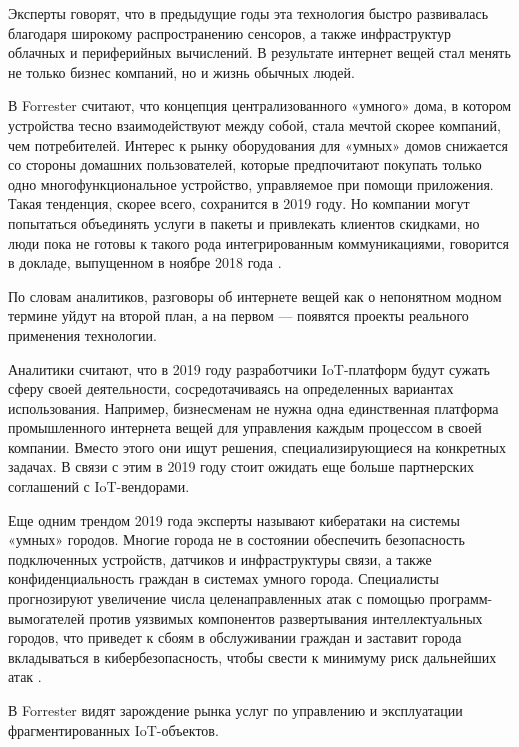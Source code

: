 Эксперты говорят, что в предыдущие годы эта технология быстро развивалась благодаря широкому распространению сенсоров, а также инфраструктур облачных и периферийных вычислений. В результате интернет вещей стал менять не только бизнес компаний, но и жизнь обычных людей.

В Forrester считают, что концепция централизованного «умного» дома, в котором устройства тесно взаимодействуют между собой, стала мечтой скорее компаний, чем потребителей. Интерес к рынку оборудования для «умных» домов снижается со стороны домашних пользователей, которые предпочитают покупать только одно многофункциональное устройство, управляемое при помощи приложения. Такая тенденция, скорее всего, сохранится в 2019 году. Но компании могут попытаться объединять услуги в пакеты и привлекать клиентов скидками, но люди пока не готовы к такого рода интегрированным коммуникациями, говорится в докладе, выпущенном в ноябре 2018 года \cite{iot_data_2019}.

По словам аналитиков, разговоры об интернете вещей как о непонятном модном термине уйдут на второй план, а на первом — появятся проекты реального применения технологии.

Аналитики считают, что в 2019 году разработчики IoT-платформ будут сужать сферу своей деятельности, сосредотачиваясь на определенных вариантах использования. Например, бизнесменам не нужна одна единственная платформа промышленного интернета вещей для управления каждым процессом в своей компании. Вместо этого они ищут решения, специализирующиеся на конкретных задачах. В связи с этим в 2019 году стоит ожидать еще больше партнерских соглашений с IoT-вендорами.

Еще одним трендом 2019 года эксперты называют кибератаки на системы «умных» городов. Многие города не в состоянии обеспечить безопасность подключенных устройств, датчиков и инфраструктуры связи, а также конфиденциальность граждан в системах умного города. Специалисты прогнозируют увеличение числа целенаправленных атак с помощью программ-вымогателей против уязвимых компонентов развертывания интеллектуальных городов, что приведет к сбоям в обслуживании граждан и заставит города вкладываться в кибербезопасность, чтобы свести к минимуму риск дальнейших атак \cite{iot_data_2019}.

В Forrester видят зарождение рынка услуг по управлению и эксплуатации фрагментированных IoT-объектов.